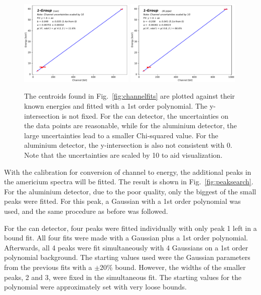 \begin{figure}[htb]
  \includegraphics[width=0.49\textwidth,page=1]{graphics/energychannelcalib.pdf}
  \includegraphics[width=0.49\textwidth,page=1]{graphics/aluenergychannelcalib.pdf}
  \caption{The centroids found in Fig.~\ref{fig:channelfits} are plotted against their known energies and fitted with a 1st order polynomial. The y-intersection is not fixed. For the can detector, the uncertainties on the data points are reasonable, while for the aluminium detector, the large uncertainties lead to a smaller Chi-squared value. For the aluminium detector, the y-intersection is also not consistent with 0. Note that the uncertainties are scaled by 10 to aid visualization.}
  \label{fig:energychannelcalib}
\end{figure}

With the calibration for conversion of channel to energy, the additional peaks in the americium spectra will be fitted. The result is shown in Fig.~\ref{fig:peaksearch}. For the aluminium detector, due to the poor quality, only the biggest of the small peaks were fitted. For this peak, a Gaussian with a 1st order polynomial was used, and the same procedure as before was followed.

For the can detector, four peaks were fitted individually with only peak 1 left in a bound fit. All four fits were made with a Gaussian plus a 1st order polynomial. Afterwards, all 4 peaks were fit simultaneously with 4 Gaussians on a 1st order polynomial background. The starting values used were the Gaussian parameters from the previous fits with a $\pm 20\%$ bound. However, the widths of the smaller peaks, 2 and 3, were fixed in the simultaneous fit. The starting values for the polynomial were approximately set with very loose bounds.

